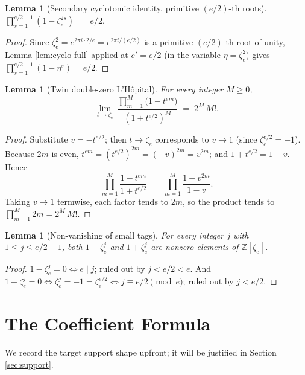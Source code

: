 \documentclass[11pt]{article}
\newtheorem{lemma}[theorem]{Lemma}
\theoremstyle{definition}
\theoremstyle{remark}
\newcommand{\zetae}{\zeta_e}
\newcommand{\ZZ}{\mathbb{Z}}
\begin{document}
\begin{lemma}[Secondary cyclotomic identity, primitive $(e/2)$-th roots]\label{lem:cyclo-half}
$\displaystyle \prod_{s=1}^{e/2-1}(1 - \zetae^{2s}) \;=\; e/2.$
\end{lemma}

\begin{proof}
Since $\zetae^2 = e^{2\pi i \cdot 2/e} = e^{2\pi i / (e/2)}$ is a primitive $(e/2)$-th root of unity, Lemma \ref{lem:cyclo-full} applied at $e' = e/2$ (in the variable $\eta = \zetae^2$) gives $\prod_{s=1}^{e/2-1}(1 - \eta^s) = e/2$.
\end{proof}

\begin{lemma}[Twin double-zero L'H\^opital]\label{lem:lhopital-twin}
For every integer $M \ge 0$,
\[
  \lim_{t \to \zetae}\, \frac{\prod_{m=1}^{M}\bigl(1 - t^{em}\bigr)}{(1 + t^{e/2})^{M}} \;=\; 2^{M}\, M!.
\]
\end{lemma}

\begin{proof}
Substitute $v = -t^{e/2}$; then $t \to \zetae$ corresponds to $v \to 1$ (since $\zetae^{e/2} = -1$). Because $2m$ is even, $t^{em} = (t^{e/2})^{2m} = (-v)^{2m} = v^{2m}$; and $1 + t^{e/2} = 1 - v$. Hence
\[
  \prod_{m=1}^{M}\frac{1 - t^{em}}{1 + t^{e/2}} \;=\; \prod_{m=1}^{M}\frac{1 - v^{2m}}{1 - v}.
\]
Taking $v \to 1$ termwise, each factor tends to $2m$, so the product tends to $\prod_{m=1}^{M} 2m = 2^{M}\, M!$.
\end{proof}

\begin{lemma}[Non-vanishing of small tags]\label{lem:tags}
For every integer $j$ with $1 \le j \le e/2 - 1$, both $1 - \zetae^{j}$ and $1 + \zetae^{j}$ are nonzero elements of $\ZZ[\zetae]$.
\end{lemma}

\begin{proof}
$1 - \zetae^{j} = 0 \iff e \mid j$; ruled out by $j < e/2 < e$. And $1 + \zetae^{j} = 0 \iff \zetae^{j} = -1 = \zetae^{e/2} \iff j \equiv e/2 \pmod{e}$; ruled out by $j < e/2$.
\end{proof}

\section{The Coefficient Formula}\label{sec:coeff}

We record the target support shape upfront; it will be justified in Section \ref{sec:support}.
\end{document}
